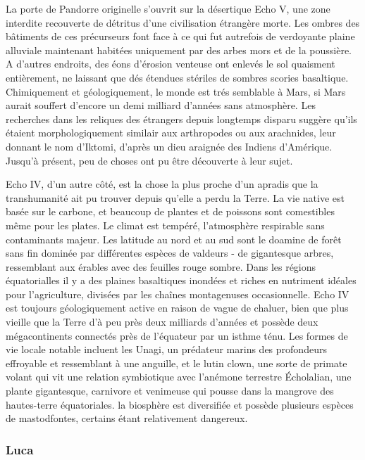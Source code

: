 La porte de Pandorre originelle s'ouvrit sur la désertique Echo V, une zone interdite recouverte de détritus d'une civilisation étrangère morte. Les ombres des bâtiments de ces précurseurs font face à ce qui fut autrefois de verdoyante plaine alluviale maintenant habitées uniquement par des arbes mors et de la poussière. A d'autres endroits, des éons d'érosion venteuse ont enlevés le sol quaisment entièrement, ne laissant que dés étendues stériles de sombres scories basaltique. Chimiquement et géologiquement, le monde est trés semblable à Mars, si Mars aurait souffert d'encore un demi milliard d'années sans atmosphère. Les recherches dans les reliques des étrangers depuis longtemps disparu suggère qu'ils étaient morphologiquement similair aux arthropodes ou aux arachnides, leur donnant le nom d'Iktomi, d'après un dieu araignée des Indiens d'Amérique. Jusqu'à présent, peu de choses ont pu être découverte à leur sujet. 

Echo IV, d'un autre côté, est la chose la plus proche d'un apradis que la transhumanité ait pu trouver depuis qu'elle a perdu la Terre. La vie native est basée sur le carbone, et beaucoup de plantes et de poissons sont comestibles même pour les plates. Le climat est tempéré, l'atmosphère respirable sans contaminants majeur. Les latitude au nord et au sud sont le doamine de forêt sans fin dominée par différentes espèces de valdeurs - de gigantesque arbres, ressemblant aux érables avec des feuilles rouge sombre. Dans les régions équatorialles il y a des plaines basaltiques inondées et riches en nutriment idéales pour l'agriculture, divisées par les chaînes montagenuses occasionnelle. Echo IV est toujours géologiquement active en raison de vague de chaluer, bien que plus vieille que la Terre d'à peu près deux milliards d'années et possède deux mégacontinents connectés près de l'équateur par un isthme ténu. Les formes de vie locale notable incluent les Unagi, un prédateur marins des profondeurs effroyable et ressemblant à une anguille, et le lutin clown, une sorte de primate volant qui vit une relation symbiotique avec l'anémone terrestre Écholalian, une plante gigantesque, carnivore et venimeuse qui pousse dans la mangrove des hautes-terre équatoriales. la biosphère est diversifiée et possède plusieurs espèces de mastodfontes, certains étant relativement dangereux. 

\subsubsection{Luca} \label{sec:luca} 

